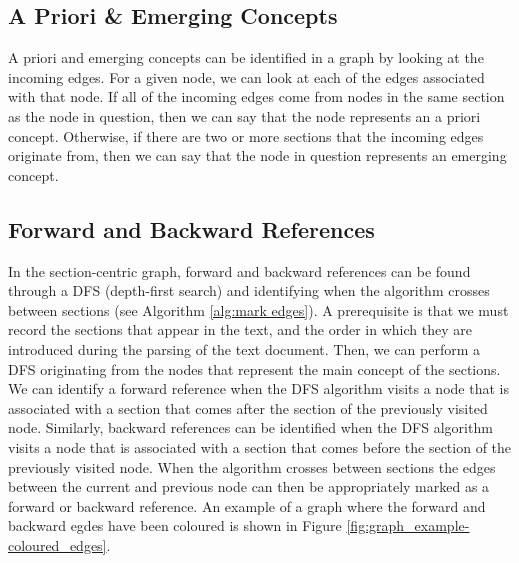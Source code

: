 \documentclass[12pt]{article}
\begin{document}
\subsection{A Priori \& Emerging Concepts}
A priori and emerging concepts can be identified in a graph by looking at the incoming edges. For a given node, we can look at each of the edges associated with that node. If all of the incoming edges come from nodes in the same section as the node in question, then we can say that the node represents an a priori concept. Otherwise, if there are two or more sections that the incoming edges originate from, then we can say that the node in question represents an emerging concept.

\subsection{Forward and Backward References}
In the section-centric graph, forward and backward references can be found through a DFS (depth-first search) and identifying when the algorithm crosses between sections (see Algorithm \ref{alg:mark edges}). A prerequisite is that we must record the sections that appear in the text, and the order in which they are introduced during the parsing of the text document. Then, we can perform a DFS originating from the nodes that represent the main concept of the sections. We can identify a forward reference when the DFS algorithm visits a node that is associated with a section that comes after the section of the previously visited node. Similarly, backward references can be identified when the DFS algorithm visits a node that is associated with a section that comes before the section of the previously visited node. When the algorithm crosses between sections the edges between the current and previous node can then be appropriately marked as a forward or backward reference. An example of a graph where the forward and backward egdes have been coloured is shown in Figure \ref{fig:graph_example-coloured_edges}.

\DontPrintSemicolon
\end{document}
